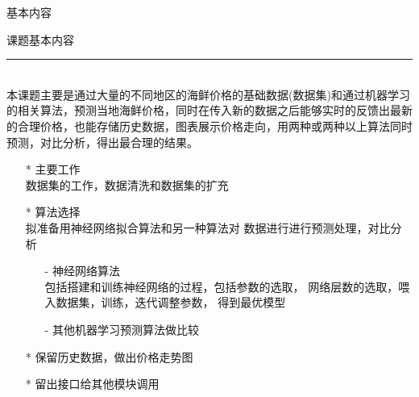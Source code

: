 \documentclass{ctexbeamer}
\begin{document}
    \begin{frame}[plain]{基本内容}
        \begin{center}
            \LARGE{课题基本内容}
        \end{center}
        \rule[5pt]{10cm}{0.005em}\\
        \tiny {本课题主要是通过大量的不同地区的海鲜价格的基础数据(数据集)和通过机器学习的相关算法，预测当地海鲜价格，同时在传入新的数据之后能够实时的反馈出最新的合理价格，也能存储历史数据，图表展示价格走向，用两种或两种以上算法同时预测，对比分析，得出最合理的结果。}
        \scriptsize
        \begin{itemize}
            \item[*] 主要工作 \\ 数据集的工作，数据清洗和数据集的扩充
            \item[*] 算法选择 \\ 拟准备用神经网络拟合算法和另一种算法对
            数据进行进行预测处理，对比分析
                \begin{itemize}
                    \scriptsize
                    \item[-] 神经网络算法 \\ 包括搭建和训练神经网络的过程，包括参数的选取，
                    网络层数的选取，喂入数据集，训练，迭代调整参数，
                    得到最优模型
                    \item[-] 其他机器学习预测算法做比较 
                \end{itemize} 
            \item[*] 保留历史数据，做出价格走势图
            \item[*] 留出接口给其他模块调用
        \end{itemize}
    \end{frame}
\end{document}
